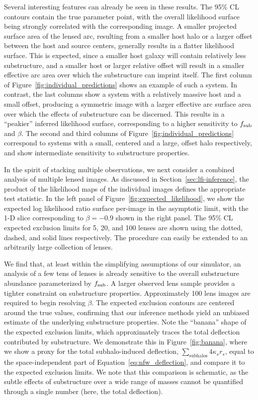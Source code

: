 \documentclass[twocolumn]{aastex63}
\begin{document}
Several interesting features can already be seen in these results. The 95\% CL contours contain the true parameter point, with the overall likelihood surface being strongly correlated with the corresponding image. A smaller projected surface area of the lensed arc, resulting from a smaller host halo or a larger offset between the host and source centers, generally results in a flatter likelihood surface. This is expected, since a smaller host galaxy will contain relatively less substructure, and a smaller host or larger relative offset will result in a smaller effective arc area over which the substructure can imprint itself. The first column of Figure~\ref{fig:individual_predictions} shows an example of such a system. In contrast, the last columns show a system with a relatively massive host and a small offset, producing a symmetric image with a larger effective arc surface area over which the effects of substructure can be discerned. This results in a ``peakier'' inferred likelihood surface, corresponding to a higher sensitivity to $f_{\mathrm{sub}}$ and $\beta$. The second and third columns of Figure~\ref{fig:individual_predictions} correspond to systems with a small, centered and a large, offset halo respectively, and show intermediate sensitivity to substructure properties.

In the spirit of stacking multiple observations, we next consider a combined analysis of multiple lensed images. As discussed in Section~\ref{sec:lfi-inference}, the product of the likelihood maps of the individual images defines the appropriate test statistic. In the left panel of Figure~\ref{fig:expected_likelihood}, we show the expected log likelihood ratio surface per-image in the asymptotic limit, with the 1-D slice corresponding to $\beta = -0.9$ shown in the right panel. The 95\% CL expected exclusion limits for 5, 20, and 100 lenses are shown using the dotted, dashed, and solid lines respectively. The procedure can easily be extended to an arbitrarily large collection of lenses.

We find that, at least within the simplifying assumptions of our simulator, an analysis of a few tens of lenses is already sensitive to the overall substructure abundance parameterized by $f_{\mathrm{sub}}$. A larger observed lens sample provides a tighter constraint on substructure properties. Approximately 100 lens images are required to begin resolving $\beta$. The expected exclusion contours are centered around the true values, confirming that our inference methods yield an unbiased estimate of the underlying substructure properties. Note the ``banana'' shape of the expected exclusion limits, which approximately traces the total deflection contributed by substructure. We demonstrate this in Figure~\ref{fig:banana}, where we show a proxy for the total subhalo-induced deflection, $\sum_{\text{subhalos}} 4 \kappa_s r_s$, equal to the space-independent part of Equation~\eqref{eq:nfw_deflection}, and compare it to the expected exclusion limits. We note that this comparison is schematic, as the subtle effects of substructure over a wide range of masses cannot be quantified through a single number (here, the total deflection).
\end{document}

